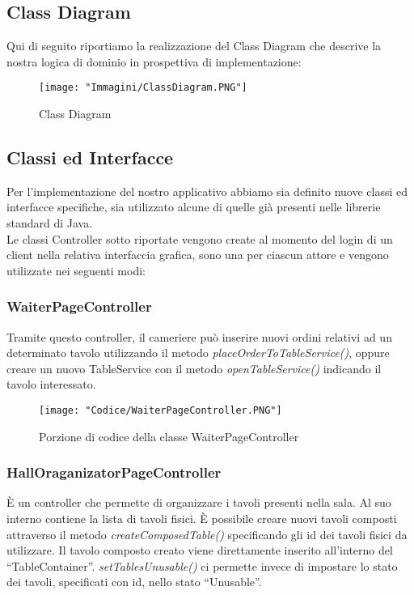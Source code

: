 \documentclass{article}
\begin{document}
\newpage

\subsection{Class Diagram}
Qui di seguito riportiamo la realizzazione del Class Diagram che descrive la nostra logica di dominio in prospettiva di implementazione:

\begin{figure}[!h]
\centering
\texttt{[image: "Immagini/ClassDiagram.PNG"]}
\caption{Class Diagram}
\label{ClassDiagram}
\end{figure}

\newpage

\subsection{Classi ed Interfacce}
Per l'implementazione del nostro applicativo abbiamo sia definito nuove classi ed interfacce specifiche, sia utilizzato alcune di quelle gi\`a presenti nelle librerie standard di Java. \\
Le classi Controller sotto riportate vengono create al momento del login di un client nella relativa interfaccia grafica, sono una per ciascun attore e vengono utilizzate nei seguenti modi: 

\subsubsection{WaiterPageController}

Tramite questo controller, il cameriere pu\`o inserire nuovi ordini relativi ad un determinato tavolo utilizzando il metodo \textit{placeOrderToTableService()}, oppure creare un nuovo TableService con il metodo \textit{openTableService()} indicando il tavolo interessato.

\begin{figure}[!h]
\centering
\texttt{[image: "Codice/WaiterPageController.PNG"]}
\caption{Porzione di codice della classe WaiterPageController}
\end{figure}


\subsubsection{HallOraganizatorPageController}

\`E un controller che permette di organizzare i tavoli presenti nella sala. Al suo interno contiene la lista di tavoli fisici. \`E possibile creare nuovi tavoli composti attraverso il metodo  \textit{createComposedTable()} specificando gli id dei tavoli fisici da utilizzare. Il tavolo composto creato viene direttamente inserito all'interno del ``TableContainer''.
\textit{setTablesUnusable()} ci permette invece di impostare lo stato dei tavoli, specificati con id, nello stato ``Unusable''.
\end{document}
